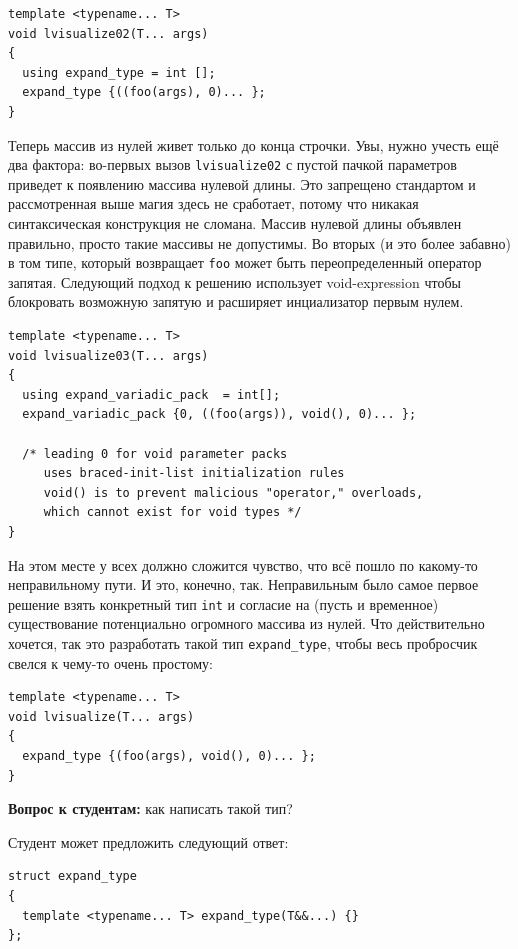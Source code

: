 \documentclass[a4paper,12pt,oneside]{book}
\newif\ifanswers
\begin{document}
\begin{lstlisting}
template <typename... T>
void lvisualize02(T... args)
{
  using expand_type = int [];
  expand_type {((foo(args), 0)... };
}
\end{lstlisting}

Теперь массив из нулей живет только до конца строчки. Увы, нужно учесть ещё два фактора: во-первых вызов \lstinline!lvisualize02! с пустой пачкой параметров приведет к появлению массива нулевой длины. Это запрещено стандартом и рассмотренная выше магия здесь не сработает, потому что никакая синтаксическая конструкция не сломана. Массив нулевой длины объявлен правильно, просто такие массивы не допустимы. Во вторых (и это более забавно) в том типе, который возвращает \lstinline!foo! может быть переопределенный оператор запятая. Следующий подход к решению использует void-expression чтобы блокровать возможную запятую и расширяет инциализатор первым нулем.

\begin{lstlisting}
template <typename... T>
void lvisualize03(T... args)
{
  using expand_variadic_pack  = int[];
  expand_variadic_pack {0, ((foo(args)), void(), 0)... };

  /* leading 0 for void parameter packs
     uses braced-init-list initialization rules
     void() is to prevent malicious "operator," overloads, 
     which cannot exist for void types */
}
\end{lstlisting}

На этом месте у всех должно сложится чувство, что всё пошло по какому-то неправильному пути. И это, конечно, так. Неправильным было самое первое решение взять конкретный тип \lstinline!int! и согласие на (пусть и временное) существование потенциально огромного массива из нулей. Что действительно хочется, так это разработать такой тип \lstinline!expand_type!, чтобы весь пробросчик свелся к чему-то очень простому:

\begin{lstlisting}
template <typename... T>
void lvisualize(T... args)
{
  expand_type {(foo(args), void(), 0)... };
}
\end{lstlisting}

\textbf{Вопрос к студентам:} как написать такой тип?

\ifanswers
Правильный ответ: см. далее
\fi

Студент может предложить следующий ответ:

\begin{lstlisting}
struct expand_type
{
  template <typename... T> expand_type(T&&...) {}
};
\end{lstlisting}
\end{document}
